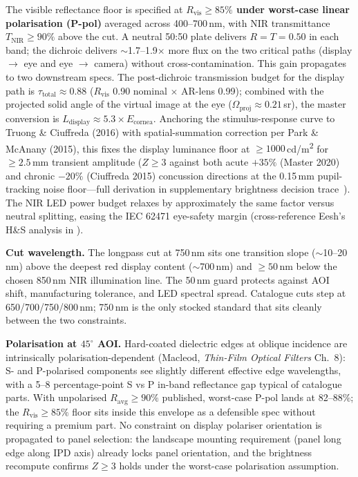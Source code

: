 The visible reflectance floor is specified at \textbf{$R_{\text{vis}} \geq 85\%$ under worst-case linear polarisation (P-pol)} averaged across 400--700\,nm, with NIR transmittance $T_{\text{NIR}} \geq 90\%$ above the cut. A neutral 50:50 plate delivers $R = T = 0.50$ in each band; the dichroic delivers $\sim$1.7--1.9$\times$ more flux on the two critical paths (display $\to$ eye and eye $\to$ camera) without cross-contamination. This gain propagates to two downstream specs. The post-dichroic transmission budget for the display path is $\tau_{\text{total}} \approx 0.88$ ($R_{\text{vis}}$ 0.90 nominal $\times$ AR-lens 0.99); combined with the projected solid angle of the virtual image at the eye ($\Omega_{\text{proj}} \approx 0.21$\,sr), the master conversion is $L_{\text{display}} \approx 5.3 \times E_{\text{cornea}}$. Anchoring the stimulus-response curve to Truong \& Ciuffreda (2016) with spatial-summation correction per Park \& McAnany (2015), this fixes the display luminance floor at $\geq 1000$\,cd/m\textsuperscript{2} for $\geq 2.5$\,mm transient  amplitude ($Z \geq 3$ against both acute $+35\%$ (Master 2020) and chronic $-20\%$ (Ciuffreda 2015) concussion directions at the 0.15\,mm pupil-tracking noise floor---full derivation in supplementary brightness decision trace~). The NIR LED power budget relaxes by approximately the same factor versus neutral splitting, easing the IEC 62471 eye-safety margin (cross-reference Eesh's H\&S analysis in ).

\textbf{Cut wavelength.} The longpass cut at 750\,nm sits one transition slope ($\sim$10--20\,nm) above the deepest red display content ($\sim$700\,nm) and $\geq 50$\,nm below the chosen 850\,nm NIR illumination line. The 50\,nm guard protects against AOI shift, manufacturing tolerance, and LED spectral spread. Catalogue cuts step at 650/700/750/800\,nm; 750\,nm is the only stocked standard that sits cleanly between the two constraints.

\textbf{Polarisation at $45^{\circ}$ AOI.} Hard-coated dielectric edges at oblique incidence are intrinsically polarisation-dependent (Macleod, \textit{Thin-Film Optical Filters} Ch.~8): S- and P-polarised components see slightly different effective edge wavelengths, with a 5--8 percentage-point S vs P in-band reflectance gap typical of catalogue parts. With unpolarised $R_{\text{avg}} \geq 90\%$ published, worst-case P-pol lands at 82--88\%; the $R_{\text{vis}} \geq 85\%$ floor sits inside this envelope as a defensible spec without requiring a premium part. No constraint on display polariser orientation is propagated to panel selection: the landscape mounting requirement (panel long edge along IPD axis) already locks panel orientation, and the brightness recompute confirms $Z \geq 3$ holds under the worst-case polarisation assumption.

